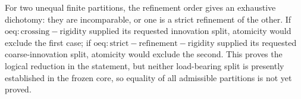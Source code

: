 For two unequal finite partitions, the refinement order gives an exhaustive dichotomy: they are incomparable, or one is a strict refinement of the other.  If \(\mathrm{oeq:crossing-rigidity}\) supplied its requested innovation split, atomicity would exclude the first case; if \(\mathrm{oeq:strict-refinement-rigidity}\) supplied its requested coarse-innovation split, atomicity would exclude the second.  This proves the logical reduction in the statement, but neither load-bearing split is presently established in the frozen core, so equality of all admissible partitions is not yet proved.